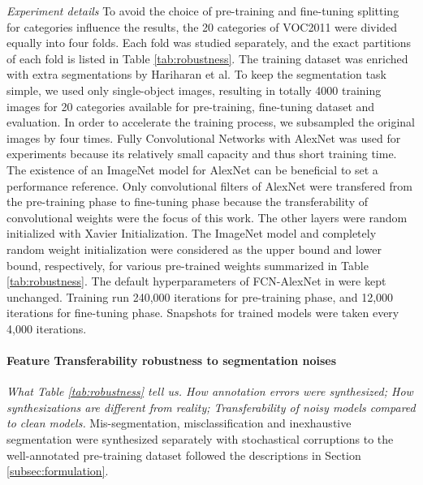 \noindent \textit{Experiment details}
\noindent
To avoid the choice of pre-training and fine-tuning splitting for categories influence the results, the 20 categories of VOC2011 were divided equally into four folds.
Each fold was studied separately, and the exact partitions of each fold is listed in Table \ref{tab:robustness}.
The training dataset was enriched with extra segmentations by Hariharan et al.\cite{hariharan2011semantic}
To keep the segmentation task simple, we used only single-object images, resulting in totally 4000 training images for 20 categories available for pre-training, fine-tuning dataset and evaluation.
In order to accelerate the training process, we subsampled the original images by four times.
Fully Convolutional Networks with AlexNet was used for experiments because its relatively small capacity and thus short training time.
The existence of an ImageNet model for AlexNet can be beneficial to set a performance reference.
Only convolutional filters of AlexNet were transfered from the pre-training phase to fine-tuning phase because the transferability of convolutional weights were the focus of this work.
The other layers were random initialized with Xavier Initialization.
The ImageNet model and completely random weight initialization were considered as the upper bound and lower bound, respectively, for various pre-trained weights summarized in Table \ref{tab:robustness}.
The default hyperparameters of FCN-AlexNet in \cite{long2015fully} were kept unchanged.
Training run 240,000 iterations for pre-training phase, and 12,000 iterations for fine-tuning phase.
Snapshots for trained models were taken every 4,000 iterations.


\paragraph{Feature Transferability robustness to segmentation noises}
\noindent \textit{What Table \ref{tab:robustness} tell us.
How annotation errors were synthesized;
How synthesizations are different from reality;
Transferability of noisy models compared to clean models.
}
\noindent
Mis-segmentation, misclassification and inexhaustive segmentation were synthesized separately with stochastical corruptions to the well-annotated pre-training dataset followed the descriptions in Section \ref{subsec:formulation}.

